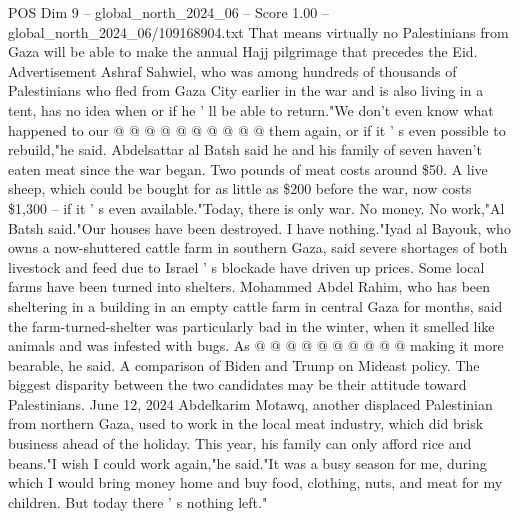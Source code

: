 \begin{textsample}{POS Dim 9 – global\_north\_2024\_06 – Score 1.00 – global\_north\_2024\_06/109168904.txt}
That means virtually no Palestinians from Gaza will be able to make the annual Hajj pilgrimage that precedes the Eid.
Advertisement Ashraf Sahwiel, who was among hundreds of thousands of Palestinians who fled from Gaza City earlier in the war and is also living in a tent, has no idea when or if he ' ll be able to return."We don't even know what happened to our @ @ @ @ @ @ @ @ @ @ them again, or if it ' s even possible to rebuild,"he said.
Abdelsattar al Batsh said he and his family of seven haven't eaten meat since the war began.
Two pounds of meat costs around \$50.
A live sheep, which could be bought for as little as \$200 before the war, now costs \$1,300 -- if it ' s even available."Today, there is only war.
No money.
No work,"Al Batsh said."Our houses have been destroyed.
I have nothing."Iyad al Bayouk, who owns a now-shuttered cattle farm in southern Gaza, said severe shortages of both livestock and feed due to Israel ' s blockade have driven up prices.
Some local farms have been turned into shelters.
Mohammed Abdel Rahim, who has been sheltering in a building in an empty cattle farm in central Gaza for months, said the farm-turned-shelter was particularly bad in the winter, when it smelled like animals and was infested with bugs.
As @ @ @ @ @ @ @ @ @ @ making it more bearable, he said.
A comparison of Biden and Trump on Mideast policy.
The biggest disparity between the two candidates may be their attitude toward Palestinians.
June 12, 2024 Abdelkarim Motawq, another displaced Palestinian from northern Gaza, used to work in the local meat industry, which did brisk business ahead of the holiday.
This year, his family can only afford rice and beans."I wish I could work again,"he said."It was a busy season for me, during which I would bring money home and buy food, clothing, nuts, and meat for my children.
But today there ' s nothing left."

\end{textsample}
